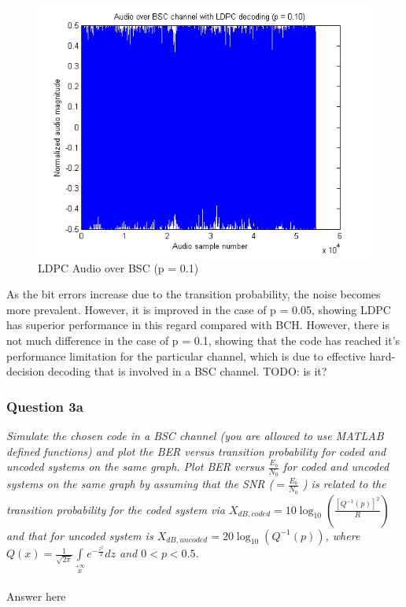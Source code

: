 \documentclass[a4paper]{article}
\begin{document}
\begin{figure}[hbtp]
\centering
\includegraphics[scale=0.5]{plots/audio_over_bsc_ldpc_p_010.png}
\caption{LDPC Audio over BSC (p = 0.1)}
\end{figure}

As the bit errors increase due to the transition probability, the noise becomes more prevalent. However, it is improved in the case of p = 0.05, showing LDPC has superior performance in this regard compared with BCH. However, there is not much difference in the case of p = 0.1, showing that the code has reached it's performance limitation for the particular channel, which is due to effective hard-decision decoding that is involved in a BSC channel. TODO: is it?

\subsubsection{Question 3a}\textit{Simulate the chosen code in a BSC channel (you are allowed to use MATLAB defined functions) and plot the BER versus transition probability for coded and uncoded systems on the same graph. Plot BER versus $\frac{E_b}{N_0}$ for coded and uncoded systems on the same graph by assuming that the SNR ($ = \frac{E_b}{N_0}$ ) is related to the transition probability for the coded system via $X_{dB,coded} = 10 \log_{10}(\frac{[Q^{−1} (p)]^2}{R}) $ and that for uncoded system is $X_{dB,uncoded} = 20\log_{10}(Q^{−1} (p)) $, where $Q(x) = \frac{1}{\sqrt{2 \pi}} \int\limits_{x}\limits^{+\infty} e^{ -\frac{z^2}{2}} dz $ and $0 < p < 0.5$.} \\
\\
Answer here \\
\end{document}
